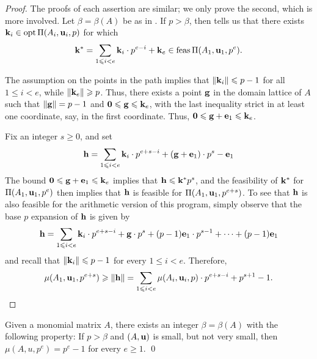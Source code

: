 \documentclass[11pt]{amsart}
\begin{document}
\begin{proof} The proofs of each assertion are similar; we only prove the second, which is more involved.  Let $\beta = \beta(A)$ be as in .  If $p > \beta$, then  tells us that there exists $\mathbf{k}_i \in \operatorname{opt} \Pi(A_i, \mathbf{u}_i, p)$ for which \[ \mathbf{k}^{\ast} = \sum_{1 \leqslant i < e} \mathbf{k}_i \cdot p^{e-i} + \mathbf{k}_e \in \operatorname{feas} \Pi(A_1, \mathbf{u}_1, p^e).\]

  The assumption on the points in the path implies that $\| \mathbf{k}_i \| \leqslant p-1$ for all $1 \leq i < e$, while $\| \mathbf{k}_e \| \geqslant p$.  Thus, there exists a point $\mathbf{g}$ in the domain lattice of $A$ such that $\| \mathbf{g} \| = p-1$ and $\mathbf{0} \leqslant \mathbf{g} \leqslant \mathbf{k}_e$, with the last inequality strict in at least one coordinate, say, in the first coordinate.  Thus, $\mathbf{0} \leqslant \mathbf{g} + \mathbf{e}_1 \leqslant \mathbf{k}_e$.

Fix an integer $s \geq 0$, and set
%
\[ \mathbf{h} = \sum_{1 \leqslant i < e} \mathbf{k}_i \cdot p^{e+s-i} + (\mathbf{g} + \mathbf{e}_1) \cdot p^{s} - \mathbf{e}_1 \]
%
The bound $\mathbf{0} \leqslant \mathbf{g} + \mathbf{e}_1 \leqslant \mathbf{k}_e$ implies that $\mathbf{h} \leqslant \mathbf{k}^{\ast}  p^s$, and the feasibility of $\mathbf{k}^{\ast}$ for $\Pi(A_1, \mathbf{u}_1, p^e)$ then implies that  $\mathbf{h}$ is feasible for $\Pi(A_1, \mathbf{u}_1, p^{e+s})$.  To see that $\mathbf{h}$ is also feasible for the arithmetic version of this program, simply observe that the base $p$ expansion of $\mathbf{h}$ is given by
%
\[ \mathbf{h} = \sum_{1 \leqslant i < e} \mathbf{k}_i \cdot p^{e+s-i} + \mathbf{g} \cdot p^{s} + (p-1) \mathbf{e}_1 \cdot p^{s-1} + \cdots + (p-1) \mathbf{e}_1 \]
%
and recall that $\| \mathbf{k}_i \| \leqslant p-1$ for every $1 \leq i < e$.  Therefore,
%
\[ \mu(A_1, \mathbf{u}_1, p^{e+s}) \geqslant \| \mathbf{h} \| = \sum_{1 \leqslant i < e} \mu(A_i, \mathbf{u}_i, p) \cdot p^{e+s-i}+ p^{s+1}-1. \qedhere\]
%
\end{proof}

\begin{corollary}
   Given a monomial matrix $A$, there exists an integer $\beta = \beta(A)$ with the following property\textup: If $p > \beta$ and $(A, \mathbf{u})$ is small, but not very small, then $\mu(A,u,p^e) = p^e-1$ for every $e \geq 1$.
   \qed
\end{corollary}
\end{document}
